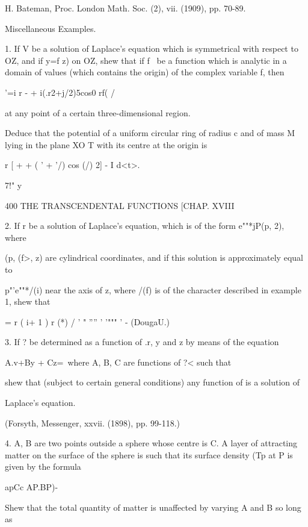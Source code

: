 H. Bateman, Proc. London Math. Soc. (2), vii. (1909), pp. 70-89.

Miscellaneous Examples.

1. If V be a solution of Laplace's equation which is symmetrical with
respect to OZ, and if y=f z) on OZ, shew that if f \ be a function
which is analytic in a domain of values (which contains the origin) of
the complex variable f, then



'=i r - + i(.r2+j/2)5cos0 rf( /



at any point of a certain three-dimensional region.

Deduce that the potential of a uniform circular ring of radius c and
of mass M lying in the plane XO T with its centre at the origin is



  r [ + + ( ' + '/) cos (/) 2] - I d<t>.

7!" y



400 THE TRANSCENDENTAL FUNCTIONS [CHAP. XVIII

2. If r be a solution of Laplace's equation, which is of the form
e""*jP(p, 2), where

(p, (f>, z) are cylindrical coordinates, and if this solution is
approximately equal to

p"'e""*/(i) near the axis of z, where /(f) is of the character
described in example 1, shew that



 = r ( i+ 1 ) r (*) / ' " '''' ' '""" ' - (DougaU.)



3. If ? be determined as a function of .r, y and z by means of the
equation

A.v+By + Cz=\, where A, B, C are functions of ?< such that

shew that (subject to certain general conditions) any function of is a
solution of

Laplace's equation.

(Forsyth, Messenger, xxvii. (1898), pp. 99-118.)

4. A, B are two points outside a sphere whose centre is C. A layer of
attracting matter on the surface of the sphere is such that its
surface density (Tp at P is given by the formula

apCc AP.BP)-\

Shew that the total quantity of matter is unaffected by varying A and
B so long as

